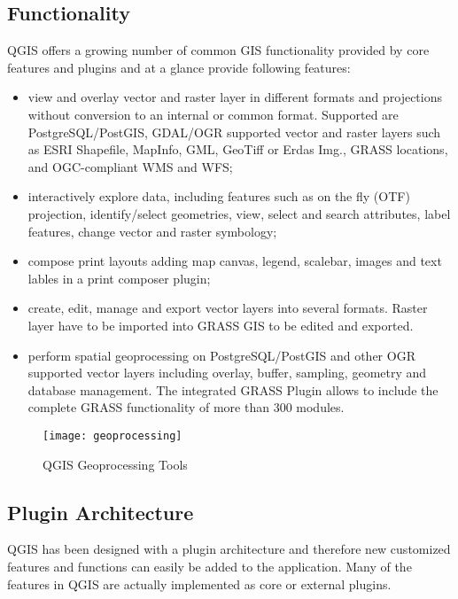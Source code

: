 \subsection{Functionality}

QGIS offers a growing number of common GIS functionality provided by core
features and plugins and at a glance provide following features: 

\begin{itemize}
\item view and overlay vector and raster layer in different formats and
projections without conversion to an internal or common format. Supported are
PostgreSQL/PostGIS, GDAL/OGR supported vector and raster layers such as ESRI
Shapefile, MapInfo, GML, GeoTiff or Erdas Img., GRASS locations, and
OGC-compliant WMS and WFS;
\item interactively explore data, including features such as on the fly
(OTF) projection, identify/select geometries, view, select and search
attributes, label features, change vector and raster symbology; 
\item compose print layouts adding map canvas, legend, scalebar, images and
text lables in a print composer plugin;
\item create, edit, manage and export vector layers into several formats.
Raster layer have to be imported into GRASS GIS to be edited and
exported. 
\item perform spatial geoprocessing on PostgreSQL/PostGIS and other OGR
supported vector layers including overlay, buffer, sampling, geometry and
database management. The integrated GRASS Plugin allows to include the
complete GRASS functionality of more than 300 modules.
\end{itemize}

\begin{figure}[h]
   \begin{center}
   \caption{QGIS Geoprocessing Tools}
    \label{fig:geoprocessing}\smallskip
   \texttt{[image: geoprocessing]}
\end{center}
\end{figure}

\subsection{Plugin Architecture}

QGIS has been designed with a plugin architecture and therefore new
customized features and functions can easily be added to the application.
Many of the features in QGIS are actually implemented as core or external
plugins. 

